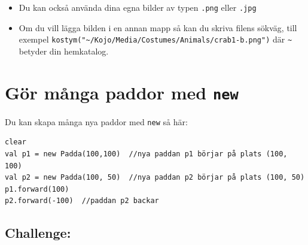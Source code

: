 \begin{itemize}

\item {Du kan också använda dina egna bilder av typen \lstinline{.png} eller \lstinline{.jpg}}
\item {Om du vill lägga bilden i en annan mapp så kan du skriva filens sökväg, till exempel \lstinline{kostym("~/Kojo/Media/Costumes/Animals/crab1-b.png")} där \lstinline{~} betyder din hemkatalog.}

\end{itemize}


\chapter{Gör många paddor med \lstinline{new}}Du kan skapa många nya paddor med \lstinline{new} så här:

\begin{lstlisting}[basicstyle={\ttfamily\fontsize{18}{22}\selectfont},numbers=none]
clear
val p1 = new Padda(100,100)  //nya paddan p1 börjar på plats (100, 100)
val p2 = new Padda(100, 50)  //nya paddan p2 börjar på plats (100, 50)
p1.forward(100)
p2.forward(-100)  //paddan p2 backar
\end{lstlisting}
        

  
\section*{\color{BrickRed}Challenge:}


